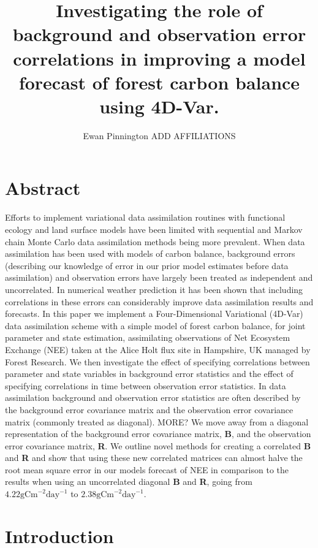 \documentclass[11pt]{article}
\title{Investigating the role of background and observation error correlations in improving a model forecast of forest carbon balance using 4D-Var.}
\author{Ewan Pinnington ADD AFFILIATIONS}
\begin{document}
\maketitle

\section*{Abstract}

Efforts to implement variational data assimilation routines with functional ecology and land surface models have been limited with sequential and Markov chain Monte Carlo data assimilation methods being more prevalent. When data assimilation has been used with models of carbon balance, background errors (describing our knowledge of error in our prior model estimates before data assimilation) and observation errors have largely been treated as independent and uncorrelated. In numerical weather prediction it has been shown that including correlations in these errors can considerably improve data assimilation results and forecasts. In this paper we implement a Four-Dimensional Variational (4D-Var) data assimilation scheme with a simple model of forest carbon balance, for joint parameter and state estimation, assimilating observations of Net Ecosystem Exchange (NEE) taken at the Alice Holt flux site in Hampshire, UK managed by Forest Research. We then investigate the effect of specifying correlations between parameter and state variables in background error statistics and the effect of specifying correlations in time between observation error statistics. In data assimilation background and observation error statistics are often described by the background error covariance matrix and the observation error covariance matrix (commonly treated as diagonal). MORE? We move away from a diagonal representation of the background error covariance matrix, \textbf{B}, and the observation error covariance matrix, \textbf{R}. We outline novel methods for creating a correlated \textbf{B} and \textbf{R} and show that using these new correlated matrices can almost halve the root mean square error in our models forecast of NEE in comparison to the results when using an uncorrelated diagonal \textbf{B} and \textbf{R}, going from $4.22\text{gCm}^{-2}\text{day}^{-1}$ to $2.38\text{gCm}^{-2}\text{day}^{-1}$.      

\section{Introduction} \label{sec:intro}
\end{document}
